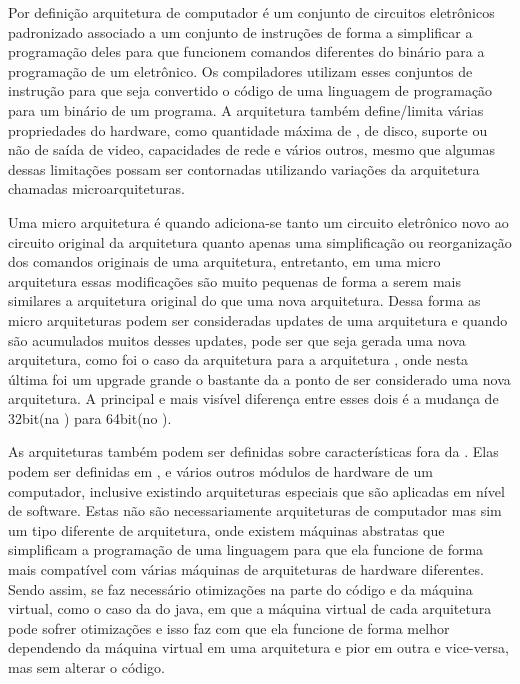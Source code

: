 \documentclass[
	12pt,				%
	openright,			%
	oneside,			%
	a4paper,			%
	english,			%
	french,				%
	spanish,			%
	brazil,				%
	]{abntex2}
\begin{document}

Por definição arquitetura de computador é um conjunto de circuitos eletrônicos padronizado associado a um conjunto de instruções de forma a simplificar a programação deles para que funcionem comandos diferentes do binário para a programação de um eletrônico. Os compiladores utilizam esses conjuntos de instrução para que seja convertido o código de uma linguagem de programação para um binário de um programa. A arquitetura também define/limita várias propriedades do hardware, como quantidade máxima de , de disco, suporte ou não de saída de video, capacidades de rede e vários outros, mesmo que algumas dessas limitações possam ser contornadas utilizando variações da arquitetura chamadas microarquiteturas.\newline

Uma micro arquitetura é quando adiciona-se tanto um circuito eletrônico novo ao circuito original da arquitetura quanto apenas uma simplificação ou reorganização dos comandos originais de uma arquitetura, entretanto, em uma micro arquitetura essas modificações são muito pequenas de forma a serem mais similares a arquitetura original do que uma nova arquitetura. Dessa forma as micro arquiteturas podem ser consideradas updates de uma arquitetura e quando são acumulados muitos desses updates, pode ser que seja gerada uma nova arquitetura, como foi o caso da arquitetura  para a arquitetura , onde nesta última foi um upgrade grande o bastante da  a ponto de ser considerado uma nova arquitetura. A principal e mais visível diferença entre esses dois é a mudança de 32bit(na ) para 64bit(no ).\newline

As arquiteturas também podem ser definidas sobre características fora da . Elas podem ser definidas em , e vários outros módulos de hardware de um computador, inclusive existindo arquiteturas especiais que são aplicadas em nível de software. Estas não são necessariamente arquiteturas de computador mas sim um tipo diferente de arquitetura, onde existem máquinas abstratas que simplificam a programação de uma linguagem para que ela funcione de forma mais compatível com várias máquinas de arquiteturas de hardware diferentes. Sendo assim, se faz necessário otimizações na parte do código e da máquina virtual, como o caso da  do java, em que a máquina virtual de cada arquitetura pode sofrer otimizações e isso faz com que ela funcione de forma melhor dependendo da máquina virtual em uma arquitetura e pior em outra e vice-versa, mas sem alterar o código.\newline
\end{document}
